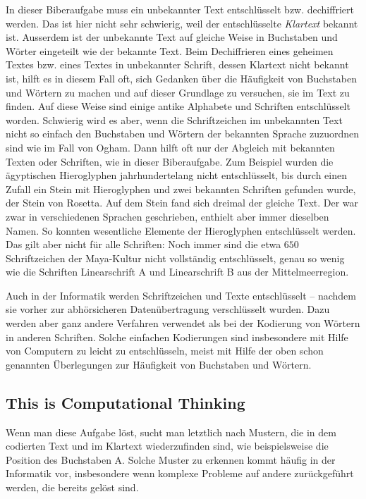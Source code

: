 \documentclass[a4paper,11pt]{report}
\begin{document}
In dieser Biberaufgabe muss ein unbekannter Text entschlüsselt bzw. dechiffriert werden.  Das ist hier nicht sehr schwierig, weil der entschlüsselte \emph{Klartext} bekannt ist. Ausserdem ist der unbekannte Text auf gleiche Weise in Buchstaben und Wörter eingeteilt wie der bekannte Text. Beim Dechiffrieren eines geheimen Textes bzw. eines Textes in unbekannter Schrift, dessen Klartext nicht bekannt ist, hilft es in diesem Fall oft, sich Gedanken über die Häufigkeit von Buchstaben und Wörtern zu machen und auf dieser Grundlage zu versuchen, sie im Text zu finden. Auf diese Weise sind einige antike Alphabete und Schriften entschlüsselt worden. Schwierig wird es aber, wenn die Schriftzeichen im unbekannten Text nicht so einfach den Buchstaben und Wörtern der bekannten Sprache zuzuordnen sind wie im Fall von Ogham. Dann hilft oft nur der Abgleich mit bekannten Texten oder Schriften, wie in dieser Biberaufgabe. Zum Beispiel wurden die ägyptischen Hieroglyphen jahrhundertelang nicht entschlüsselt, bis durch einen Zufall ein Stein mit Hieroglyphen und zwei bekannten Schriften gefunden wurde, der Stein von Rosetta. Auf dem Stein fand sich dreimal der gleiche Text. Der war zwar in verschiedenen Sprachen geschrieben, enthielt aber immer dieselben Namen. So konnten wesentliche Elemente der Hieroglyphen entschlüsselt werden. Das gilt aber nicht für alle Schriften: Noch immer sind die etwa $650$ Schriftzeichen der Maya-Kultur nicht vollständig entschlüsselt, genau so wenig wie die Schriften Linearschrift A und Linearschrift B aus der Mittelmeerregion.

Auch in der Informatik werden Schriftzeichen und Texte entschlüsselt – nachdem sie vorher zur abhörsicheren Datenübertragung verschlüsselt wurden.  Dazu werden aber ganz andere Verfahren verwendet als bei der Kodierung von Wörtern in anderen Schriften.  Solche einfachen Kodierungen sind insbesondere mit Hilfe von Computern zu leicht zu entschlüsseln, meist mit Hilfe der oben schon genannten Überlegungen zur Häufigkeit von Buchstaben und Wörtern.


\subsection*{This is Computational Thinking}

Wenn man diese Aufgabe löst, sucht man letztlich nach Mustern, die in dem codierten Text und im Klartext wiederzufinden sind, wie beispielsweise die Position des Buchstaben A. Solche Muster zu erkennen kommt häufig in der Informatik vor, insbesondere wenn komplexe Probleme auf andere zurückgeführt werden, die bereits gelöst sind.
\end{document}
